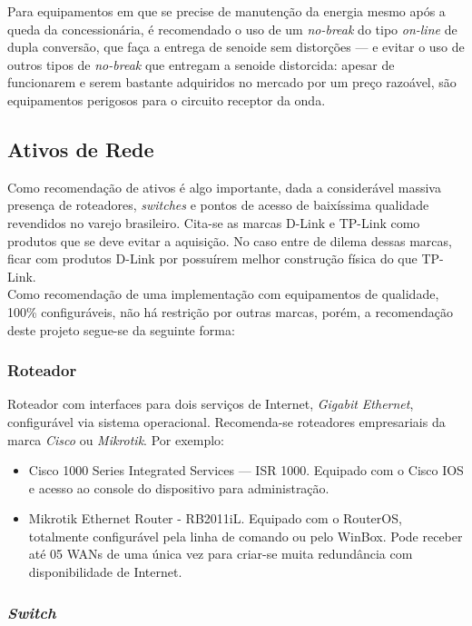 \documentclass[	DIV=calc,%
							paper=a4,%
							fontsize=12pt,%
							onecolumn]{scrartcl}	 					%
\begin{document}
Para equipamentos em que se precise de manutenção da energia mesmo após a queda da concessionária, é recomendado o uso de um \textit{no-break} do tipo \textit{on-line} de dupla conversão, que faça a entrega de senoide sem distorções --- e evitar o uso de outros tipos de \textit{no-break} que entregam a senoide distorcida: apesar de funcionarem e serem bastante adquiridos no mercado por um preço razoável, são equipamentos perigosos para o circuito receptor da onda.

\subsection{Ativos de Rede}

Como recomendação de ativos é algo importante, dada a considerável massiva presença de roteadores, \textit{switches} e pontos de acesso de baixíssima qualidade revendidos no varejo brasileiro. Cita-se as marcas D-Link e TP-Link como produtos que se deve evitar a aquisição. No caso entre de dilema dessas marcas, ficar com produtos D-Link por possuírem melhor construção física do que TP-Link. 
\\

Como recomendação de uma implementação com equipamentos de qualidade, 100\% configuráveis, não há restrição por outras marcas, porém, a recomendação deste projeto segue-se da seguinte forma:

\subsubsection{Roteador}

Roteador com interfaces para dois serviços de Internet, \textit{Gigabit Ethernet}, configurável via sistema operacional. Recomenda-se roteadores empresariais da marca \textit{Cisco} ou \textit{Mikrotik}. Por exemplo:

\begin{itemize}
\item{Cisco 1000 Series Integrated Services --- ISR 1000}. Equipado com o Cisco IOS e acesso ao console do dispositivo para administração.
\item{Mikrotik Ethernet Router - RB2011iL}. Equipado com o RouterOS, totalmente configurável pela linha de comando ou pelo WinBox. Pode receber até 05 WANs de uma única vez para criar-se muita redundância com disponibilidade de Internet. 
\end{itemize}

\subsubsection{\textit{Switch}}
\end{document}
